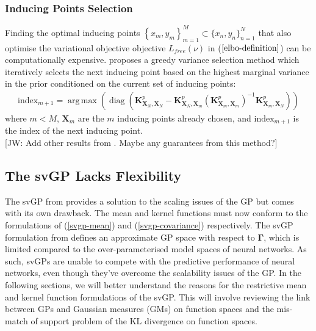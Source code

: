\documentclass{article}
\newcommand{\jw}[1]{{\color{gray} [JW: #1]}}
\newcommand{\diag}{\operatorname{diag}}
\DeclareMathOperator*{\argmax}{arg\,max}
\numberwithin{equation}{section}
\begin{document}
\subsubsection{Inducing Points Selection}
Finding the optimal inducing points $\left\{x_m, y_m\right\}_{m=1}^{M} \subset \{x_n, y_n\}_{n=1}^{N}$ that also optimise the variational objective objective $L_{free}(\nu)$ in ($\ref{elbo-definition}$) can be computationally expensive. \cite{burt2020convergence} proposes a greedy variance selection method which iteratively selects the next inducing point based on the highest marginal variance in the prior conditioned on the current set of inducing points:
\begin{align}
    \label{greedy-varaince-selection}
    \text{index}_{m+1} = \argmax \left(\diag \left(\mathbf{K}^p_{\mathbf{X}_N, \mathbf{X}_N} - \mathbf{K}^p_{\mathbf{X}_N, \mathbf{X}_{m}} \left(\mathbf{K}^p_{\mathbf{X}_{m}, \mathbf{X}_{m}}\right)^{-1}\mathbf{K}^p_{\mathbf{X}_{m}, \mathbf{X}_N}\right)\right)
\end{align}
where $m < M$, $\mathbf{X}_{m}$ are the $m$ inducing points already chosen, and $\text{index}_{m+1}$ is the index of the next inducing point.
\\\jw{Add other results from \cite{burt2020convergence}. Maybe any guarantees from this method?}

\subsection{The svGP Lacks Flexibility}
The svGP from \cite{titsias2009variational} provides a solution to the scaling issues of the GP but comes with its own drawback. The mean and kernel functions must now conform to the formulations of (\ref{svgp-mean}) and (\ref{svgp-covariance}) respectively. The svGP formulation from \cite{titsias2009variational} defines an approximate GP space with respect to $\mathbf{\Gamma}$, which is limited compared to the over-parameterised model spaces of neural networks. As such, svGPs are unable to compete with the predictive performance of neural networks, even though they've overcome the scalability issues of the GP. In the following sections, we will better understand the reasons for the restrictive mean and kernel function formulations of the svGP. This will involve reviewing the link between GPs and Gaussian measures (GMs) on function spaces and the mis-match of support problem of the KL divergence on function spaces. 
\end{document}
